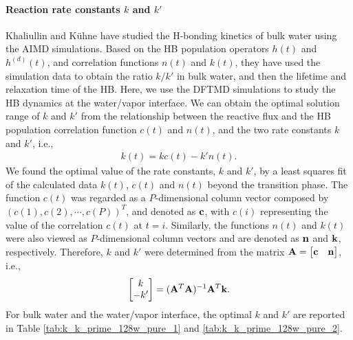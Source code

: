 \paragraph{Reaction rate constants $k$ and $k'$}
Khaliullin and K\"uhne have studied the H-bonding kinetics of bulk water using the AIMD simulations.\cite{Khaliullin2013}
Based on the HB population operators $h(t)$ and $h^{(d)}(t)$, and correlation functions $n(t)$ and $k(t)$, they have used the simulation data 
to obtain the ratio $k/k'$ in bulk water, and then the lifetime and relaxation time 
of the HB.  Here, we use the DFTMD simulations to study the HB dynamics at the water/vapor interface.
We can obtain the optimal solution range of $k$ and $k'$ from the relationship between the reactive flux 
and the HB population correlation function $c(t)$ and $n(t)$, and the two rate constants $k$ and $k'$, i.e.,
\begin{eqnarray}
  k(t) = kc(t)-k'n(t).
\label{eq:fitting_k_rates}
\end{eqnarray}
We found the optimal value of the rate constants, $k$ and $k'$, 
by a least squares fit of the calculated data $k(t)$, $c(t)$ and $n(t)$ beyond the transition phase.  
The function $c(t)$ was regarded as a $P$-dimensional column vector composed by $(c(1),c(2),\cdots,c(P))^T$, and denoted as ${\bf c}$,
with $c(i)$ representing the value of the correlation $c(t)$ at $t=i$.
Similarly, the functions $n(t)$ and $k(t)$ were also viewed as $P$-dimensional column vectors and are denoted as ${\bf n}$ and ${\bf k}$, respectively.
Therefore, $k$ and $k'$ were determined from the matrix ${\bf A} = \begin{bmatrix} {\bf c} & {\bf n} \end{bmatrix}$, i.e., 
\begin{equation}
\begin{bmatrix} k\\ -k' \end{bmatrix} = ({\bf A}^T {\bf A})^{-1} {\bf A}^T {\bf k}. 
\end{equation}
For bulk water and the water/vapor interface, the optimal $k$ and $k'$ are reported in Table 
\ref{tab:k_k_prime_128w_pure_1} and \ref{tab:k_k_prime_128w_pure_2}. 
% 
